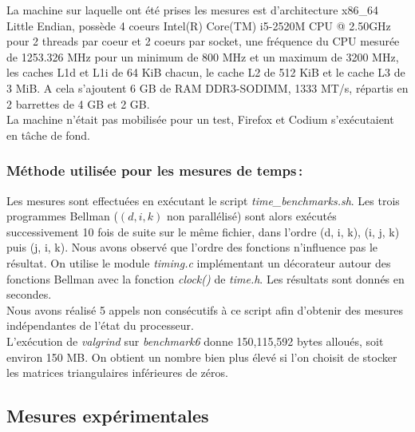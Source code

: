 \documentclass[a4paper, 10pt, french]{article}
\begin{document}
La machine sur laquelle ont été prises les mesures est d'architecture x86\_64 Little Endian, possède 4 coeurs Intel(R) Core(TM) i5-2520M CPU @ 2.50GHz pour 2 threads par coeur et 2 coeurs par socket, une fréquence du CPU mesurée de 1253.326 MHz pour un minimum de 800 MHz et un maximum de 3200 MHz, les caches L1d et L1i de 64 KiB chacun, le cache L2 de 512 KiB et le cache L3 de 3 MiB. 
A cela s'ajoutent 6 GB de RAM DDR3-SODIMM, 1333 MT/s, répartis en 2 barrettes de 4 GB et 2 GB.
\\

La machine n'était pas mobilisée pour un test, Firefox et Codium s'exécutaient en tâche de fond.

\subsubsection{Méthode utilisée pour les mesures de temps\,: }

Les mesures sont effectuées en exécutant le script {\em time\_benchmarks.sh}. Les trois programmes Bellman ($(d, i, k)$ non parallélisé) sont alors exécutés successivement 10 fois de suite sur le même fichier, dans l'ordre (d, i, k), (i, j, k) puis (j, i, k). Nous avons observé que l'ordre des fonctions n'influence pas le résultat. 
On utilise le module {\em timing.c} implémentant un décorateur autour des fonctions Bellman avec la fonction {\em clock()} de {\em time.h}. Les résultats sont donnés en secondes. \\

Nous avons réalisé 5 appels non consécutifs à ce script afin d'obtenir des mesures indépendantes de l'état du processeur. \\

L'exécution de {\em valgrind} sur {\em benchmark6} donne 150,115,592 bytes alloués, soit environ 150 MB. On obtient un nombre bien plus élevé si l'on choisit de stocker les matrices triangulaires inférieures de zéros.

\subsection{Mesures expérimentales}
\end{document}
